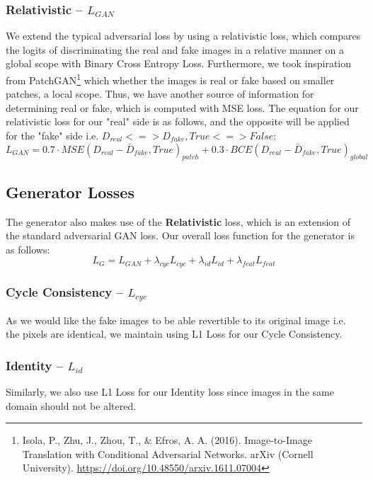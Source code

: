 \documentclass[twoside,english,notitlepage]{report}
\begin{document}
\subsubsection{Relativistic – $L_{GAN}$}
We extend the typical adversarial loss by using a relativistic loss, which compares the logits of discriminating the real and fake images in a relative manner on a global scope with Binary Cross Entropy Loss. Furthermore, we took inspiration from PatchGAN\footnote{Isola, P., Zhu, J., Zhou, T., \& Efros, A. A. (2016). Image-to-Image Translation with Conditional Adversarial Networks. arXiv (Cornell University). \href{https://doi.org/10.48550/arxiv.1611.07004}{https://doi.org/10.48550/arxiv.1611.07004}} which whether the images is real or fake based on smaller patches, a local scope. Thus, we have another source of information for determining real or fake, which is computed with MSE loss. The equation for our relativistic loss for our "real" side is as follows, and the opposite will be applied for the "fake" side i.e. $D_{real} <=> D_{fake}, True <=> False$:
\begin{equation}
    L_{GAN} = 0.7 \cdot MSE(D_{real} - \bar{D}_{fake}, True)_{patch} + 0.3 \cdot BCE(D_{real} - \bar{D}_{fake}, True)_{global}
\end{equation}

\subsection{Generator Losses}
The generator also makes use of the \textbf{Relativistic} loss, which is an extension of the standard adversarial GAN loss. Our overall loss function for the generator is as follows:
\begin{equation}
    L_{G} = L_{GAN} + \lambda_{cyc} L_{cyc} + \lambda_{id} L_{id} + \lambda_{feat} L_{feat}
\end{equation}
\subsubsection{Cycle Consistency – $L_{cyc}$}
As we would like the fake images to be able revertible to its original image i.e. the pixels are identical, we maintain using L1 Loss for our Cycle Consistency.

\subsubsection{Identity – $L_{id}$}
Similarly, we also use L1 Loss for our Identity loss since images in the same domain should not be altered. 
\end{document}
